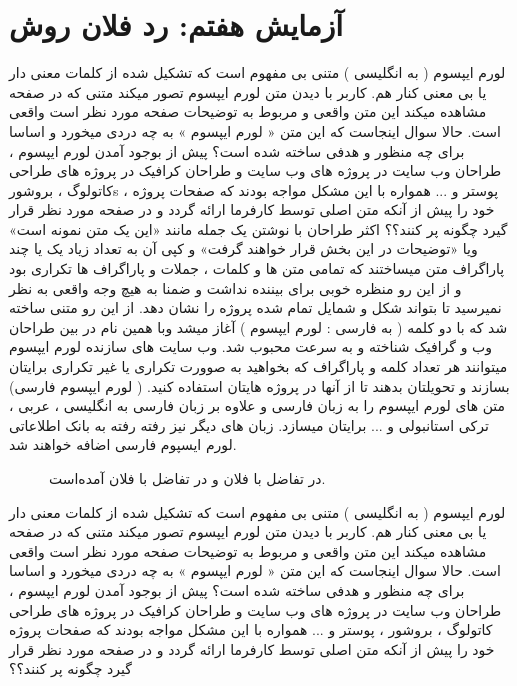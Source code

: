 \FloatBarrier
\section{آزمایش هفتم: رد فلان روش}

لورم ایپسوم ( به انگلیسی  ) متنی بی مفهوم است که تشکیل شده از کلمات معنی دار یا بی معنی کنار هم. کاربر با دیدن متن لورم ایپسوم تصور میکند متنی که در صفحه مشاهده میکند این متن واقعی و مربوط به توضیحات صفحه مورد نظر است واقعی است. حالا سوال اینجاست که این متن « لورم ایپسوم » به چه دردی میخورد و اساسا برای چه منظور و هدفی ساخته شده است؟ پیش از بوجود آمدن لورم ایپسوم ، طراحان وب سایت در پروژه های وب سایت و طراحان کرافیک در پروژه های طراحی کاتولوگ ، بروشورs ، پوستر و ... همواره با این مشکل مواجه بودند که صفحات پروژه خود را پیش از آنکه متن اصلی توسط کارفرما ارائه گردد و در صفحه مورد نظر قرار گیرد چگونه پر کنند؟؟ اکثر طراحان با نوشتن یک جمله مانند «این یک متن نمونه است» ویا «توضیحات در این بخش قرار خواهند گرفت» و کپی آن به تعداد زیاد یک یا چند پاراگراف متن میساختند که تمامی متن ها و کلمات ، جملات و پاراگراف ها تکراری بود و از این رو منظره خوبی برای بیننده نداشت و ضمنا به هیچ وجه واقعی به نظر نمیرسید تا بتواند شکل و شمایل تمام شده پروژه را نشان دهد. از این رو متنی ساخته شد که با دو کلمه ( به فارسی : لورم ایپسوم ) آغاز میشد وبا همین نام در بین طراحان وب و گرافیک شناخته و به سرعت محبوب شد. وب سایت های سازنده لورم ایپسوم میتوانند هر تعداد کلمه و پاراگراف که بخواهید به صوورت تکراری یا غیر تکراری برایتان بسازند و تحویلتان بدهند تا از آنها در پروژه هایتان استفاده کنید. ( لورم ایپسوم فارسی) متن های لورم ایپسوم را به زبان فارسی و علاوه بر زبان فارسی به انگلیسی ، عربی ، ترکی استانبولی و ... برایتان میسازد. زبان های دیگر نیز رفته رفته به بانک اطلاعاتی لورم ایسپوم فارسی اضافه خواهند شد.  


 \begin{figure}[!htb]
\centering   %
{}\hspace{-12mm}
\caption[نمونه‌ی تفاضل در تشخیص درست]
{در   تفاضل با فلان و در  تفاضل با فلان آمده‌است.}
\label{fig:fft-diff}
\end{figure}
لورم ایپسوم ( به انگلیسی  ) متنی بی مفهوم است که تشکیل شده از کلمات معنی دار یا بی معنی کنار هم. کاربر با دیدن متن لورم ایپسوم تصور میکند متنی که در صفحه مشاهده میکند این متن واقعی و مربوط به توضیحات صفحه مورد نظر است واقعی است. حالا سوال اینجاست که این متن « لورم ایپسوم » به چه دردی میخورد و اساسا برای چه منظور و هدفی ساخته شده است؟ پیش از بوجود آمدن لورم ایپسوم ، طراحان وب سایت در پروژه های وب سایت و طراحان کرافیک در پروژه های طراحی کاتولوگ ، بروشور ، پوستر و ... همواره با این مشکل مواجه بودند که صفحات پروژه خود را پیش از آنکه متن اصلی توسط کارفرما ارائه گردد و در صفحه مورد نظر قرار گیرد چگونه پر کنند؟؟ 

